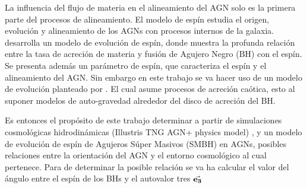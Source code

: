 La influencia del flujo de materia en el alineamiento del AGN solo es la primera parte del procesos de alineamiento. El modelo de espín estudia el origen, evolución y alineamiento de los AGNs con procesos internos de la galaxia. \cite{fanidakis2011} desarrolla un modelo de evolución de espín, donde muestra la profunda relación entre la tasa de acreción de materia y fusión de Agujero Negro (BH) con el espín. Se presenta además un parámetro de espín, que caracteriza el espín y el alineamiento del AGN. Sin embargo en este trabajo se va hacer uso de un modelo de evolución planteado por \cite{Bustamante2018b}. El cual asume procesos de acreción caótica, esto al suponer modelos de auto-gravedad alrededor del disco de acreción del BH. 
 
Es entonces el propósito de este trabajo determinar a partir de simulaciones cosmológicas hidrodinámicas (Illustris TNG AGN+ physics model) \cite{springel2010}, y un modelo de evolución de espín de Agujeros Súper Masivos (SMBH) en AGNs, posibles relaciones entre la orientación del AGN y el entorno cosmológico al cual pertenece. Para de determinar la posible relación se va ha calcular el valor del ángulo entre el espín de los BHs y el autovalor tres $\vec{\bf{e_3}}$

